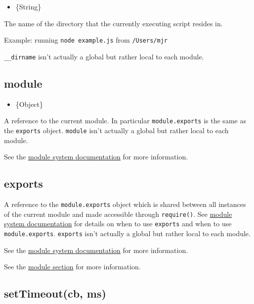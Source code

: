\begin{itemize}
\item
  \{String\}
\end{itemize}

The name of the directory that the currently executing script resides
in.

Example: running \texttt{node example.js} from \texttt{/Users/mjr}

\begin{Shaded}
\begin{Highlighting}[]
\end{Highlighting}
\end{Shaded}

\texttt{\_\_dirname} isn't actually a global but rather local to each
module.

\subsection{module}

\begin{itemize}
\item
  \{Object\}
\end{itemize}

A reference to the current module. In particular \texttt{module.exports}
is the same as the \texttt{exports} object. \texttt{module} isn't
actually a global but rather local to each module.

See the \href{modules.html}{module system documentation} for more
information.

\subsection{exports}

A reference to the \texttt{module.exports} object which is shared
between all instances of the current module and made accessible through
\texttt{require()}. See \href{modules.html}{module system documentation}
for details on when to use \texttt{exports} and when to use
\texttt{module.exports}. \texttt{exports} isn't actually a global but
rather local to each module.

See the \href{modules.html}{module system documentation} for more
information.

See the \href{modules.html}{module section} for more information.

\subsection{setTimeout(cb, ms)}

